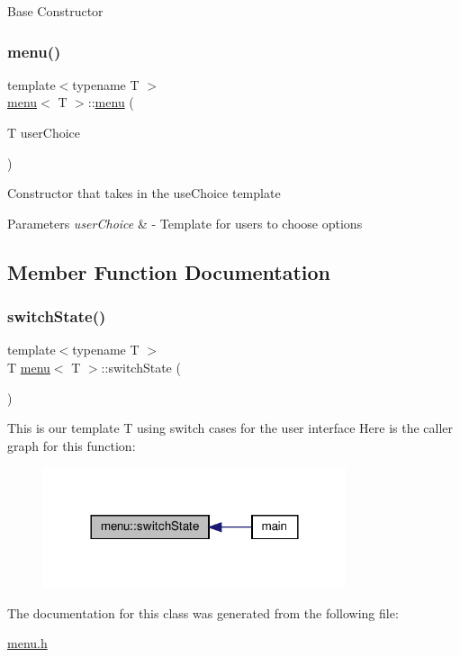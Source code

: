 Base Constructor \mbox{\label{classmenu_a1ba608803dbd7d3eb5d5f0c7dd58a9f3}} 
\subsubsection{\texorpdfstring{menu()}{menu()}\hspace{0.1cm}{\footnotesize\ttfamily [2/2]}}
{\footnotesize\ttfamily template$<$typename T $>$ \\
\hyperlink{classmenu}{menu}$<$ T $>$\+::\hyperlink{classmenu}{menu} (\begin{DoxyParamCaption}\item[{T}]{user\+Choice }\end{DoxyParamCaption})}

Constructor that takes in the use\+Choice template 
\begin{DoxyParams}{Parameters}
{\em user\+Choice} & -\/ Template for users to choose options \\
\hline
\end{DoxyParams}


\subsection{Member Function Documentation}
\mbox{\label{classmenu_a5ee13e54600aaa2a1202264a2992a493}} 
\subsubsection{\texorpdfstring{switch\+State()}{switchState()}}
{\footnotesize\ttfamily template$<$typename T $>$ \\
T \hyperlink{classmenu}{menu}$<$ T $>$\+::switch\+State (\begin{DoxyParamCaption}{ }\end{DoxyParamCaption})}

This is our template T using switch cases for the user interface Here is the caller graph for this function\+:\nopagebreak
\begin{figure}[H]
\begin{center}
\leavevmode
\includegraphics[width=252pt]{classmenu_a5ee13e54600aaa2a1202264a2992a493_icgraph}
\end{center}
\end{figure}


The documentation for this class was generated from the following file\+:\begin{DoxyCompactItemize}
\item 
\hyperlink{menu_8h}{menu.\+h}\end{DoxyCompactItemize}
